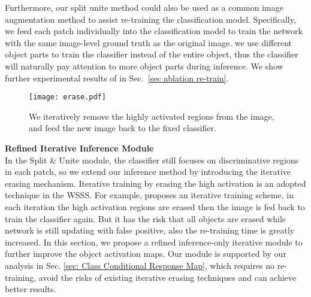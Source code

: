 \documentclass[10pt,twocolumn,letterpaper]{article}
\begin{document}
Furthermore, our split  unite method could also be used as a common image augmentation method to assist re-training the classification model.
Specifically, we feed each patch individually into the classification model to train the network with the same image-level ground truth as the original image.
\ie we use different object parts to train the classifier instead of the entire object, thus the classifier will naturally pay attention to more object parts during inference.
We show further experimental results of in Sec.~\ref{sec ablation re-train}.









\begin{figure}[t!]
  \begin{center}
  {\texttt{[image: erase.pdf]}}
  \end{center}
    \vspace{-3mm}
\caption{
We iteratively remove the highly activated regions from the image, and
feed the new image back to the fixed classifier.
}
\vspace{-2mm}
  \label{fig: iterative}
\end{figure}



















\noindent\textbf{Refined Iterative Inference Module}\\
In the Split \& Unite module, the classifier still focuses on discriminative regions in each patch,
so we extend our inference method by introducing the iterative erasing mechanism.
Iterative training by erasing the high activation is an adopted technique in the WSSS.
For example, \cite{wei2017object} proposes an iterative training scheme, in each iteration the high activation regions are erased then the image is fed back to train the classifier again.
But it has the risk that all objects are erased while network is still updating with false positive, also the re-training time is greatly increased.
In this section, we propose a refined inference-only iterative module to further improve the object activation maps. Our module is supported by our analysis in Sec. \ref{sec: Class Conditional Response Map}, which
requires no re-training, avoid the risks of existing iterative erasing techniques and can achieve better results.
\end{document}
